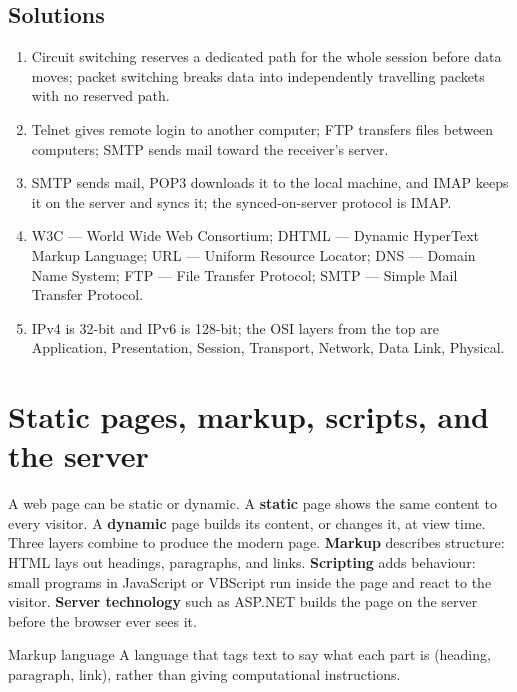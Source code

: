 \subsection*{Solutions}
\begingroup\small
\begin{enumerate}[label=\arabic*.]
  \item Circuit switching reserves a dedicated path for the whole session
    before data moves; packet switching breaks data into independently
    travelling packets with no reserved path.
  \item Telnet gives remote login to another computer; FTP transfers files
    between computers; SMTP sends mail toward the receiver's server.
  \item SMTP sends mail, POP3 downloads it to the local machine, and IMAP
    keeps it on the server and syncs it; the synced-on-server protocol is
    IMAP.
  \item W3C --- World Wide Web Consortium; DHTML --- Dynamic HyperText Markup
    Language; URL --- Uniform Resource Locator; DNS --- Domain Name System;
    FTP --- File Transfer Protocol; SMTP --- Simple Mail Transfer Protocol.
  \item IPv4 is 32-bit and IPv6 is 128-bit; the OSI layers from the top are
    Application, Presentation, Session, Transport, Network, Data Link,
    Physical.
\end{enumerate}
\endgroup

\section{Static pages, markup, scripts, and the server}
A web page can be static or dynamic. A \textbf{static} page shows the same content to every visitor. A \textbf{dynamic} page builds its content, or changes it, at view time. Three layers combine to produce the modern page. \textbf{Markup} describes structure: HTML lays out headings, paragraphs, and links. \textbf{Scripting} adds behaviour: small programs in JavaScript or VBScript run inside the page and react to the visitor. \textbf{Server technology} such as ASP.NET builds the page on the server before the browser ever sees it.

\begin{definitionbox}{Markup language}
A language that tags text to say what each part is (heading, paragraph, link), rather than giving computational instructions.
\end{definitionbox}

